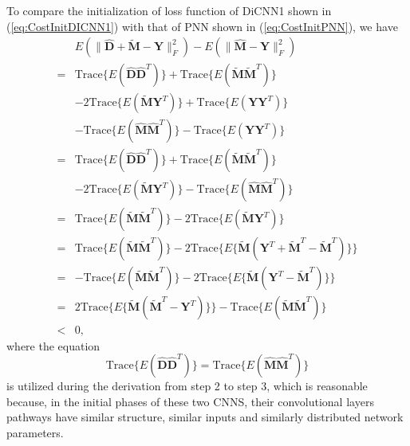 \documentclass[journal]{IEEEtran}
\begin{document}
To compare the initialization of loss function of DiCNN1 shown in (\ref{eq:CostInitDICNN1}) with that of PNN shown in (\ref{eq:CostInitPNN}), we have
\begin{equation}\label{eq:E(compare)}
\begin{split}
&E(\|\widehat{\mathbf{D}} + \widetilde {\mathbf{M}} - {\mathbf{Y}}\|^2_F) - E(\|\widehat {\mathbf {M}} - {\mathbf{Y}}\|^2_F)\\
=&\mathrm{Trace}\{E(\widehat{\mathbf{D}}\widehat{\mathbf{D}}^T)\}+\mathrm{Trace}\{E(\widetilde {\mathbf{M}}\widetilde {\mathbf{M}}^T)\}\\
&-2\mathrm{Trace}\{E(\widetilde {\mathbf{M}}\mathbf{Y}^T)\}+\mathrm{Trace}\{E(\mathbf{Y}\mathbf{Y}^T)\}\\
&-\mathrm{Trace}\{E(\widehat {\mathbf {M}}\widehat {\mathbf {M}}^T)\}-\mathrm{Trace}\{E(\mathbf{Y}\mathbf{Y}^T)\}\\
=&\mathrm{Trace}\{E(\widehat{\mathbf{D}}\widehat{\mathbf{D}}^T)\}+\mathrm{Trace}\{E(\widetilde {\mathbf{M}}\widetilde {\mathbf{M}}^T)\}\\
&-2\mathrm{Trace}\{E(\widetilde {\mathbf{M}}\mathbf{Y}^T)\}-\mathrm{Trace}\{E(\widehat {\mathbf {M}}\widehat {\mathbf {M}}^T)\}\\
=&\mathrm{Trace}\{E(\widetilde {\mathbf{M}}\widetilde {\mathbf{M}}^T)\}-2\mathrm{Trace}\{E(\widetilde {\mathbf{M}}\mathbf{Y}^T)\}\\
=&\mathrm{Trace}\{E(\widetilde {\mathbf{M}}\widetilde {\mathbf{M}}^T)\}-2\mathrm{Trace}\{E\{\widetilde {\mathbf{M}}(\mathbf{Y}^T+\widetilde {\mathbf{M}}^T-\widetilde {\mathbf{M}}^T)\}\}\\
=&-\mathrm{Trace}\{E(\widetilde {\mathbf{M}}\widetilde {\mathbf{M}}^T)\}-2\mathrm{Trace}\{E\{\widetilde {\mathbf{M}}(\mathbf{Y}^T-\widetilde {\mathbf{M}}^T)\}\}\\
=&2\mathrm{Trace}\{E\{\widetilde {\mathbf{M}}(\widetilde{\mathbf{M}}^T-\mathbf{Y}^T)\}\}-\mathrm{Trace}\{E(\widetilde {\mathbf{M}}\widetilde {\mathbf{M}}^T)\}\\
<& 0,
\end{split}
\end{equation}
where the equation
\begin{equation}
\mathrm{Trace}\{E(\widehat{\mathbf{D}}\widehat{\mathbf{D}}^T)\}=\mathrm{Trace}\{E(\widehat {\mathbf {M}}\widehat {\mathbf {M}}^T)\}
\end{equation}
is utilized during the derivation from step 2 to step 3, which is reasonable because, in the initial phases of these two CNNS, their convolutional layers pathways have similar structure, similar inputs and similarly distributed network parameters.
\end{document}

